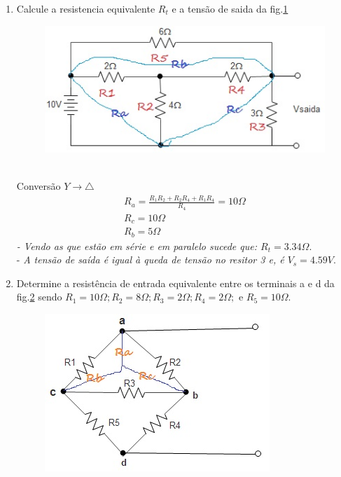 \documentclass[12pt,a4paper,titlepage]{report}
\begin{document}
\begin{enumerate}
\item Calcule a resistencia equivalente $R_t$ e a tensão de saida da fig.\ref{f1}
\begin{figure}[h]
\centering
\includegraphics[scale=0.6]{fig1}
\caption{}
\label {f1}
\end{figure}\\
Convers\~ao $Y \longrightarrow\bigtriangleup$\\
\begin{eqnarray}
R_a=\frac{R_1R_2+R_2R_4+R_1R_4}{R_4}=10\Omega\\
R_c=10\Omega\\
R_b=5\Omega
\end{eqnarray}
\textit{- Vendo as que est\~ao em s\'erie e em paralelo sucede que: $R_t=3.34\Omega$}.\\
- \textit{A tens\~ao de sa\'ida \'e igual \`a queda de tens\~ao no resitor 3 e, \'e  $V_s=4.59V$}.
\vspace{4cm}
\item Determine a resistência de entrada equivalente entre os terminais a e d da fig.\ref{f2} sendo $R_1=10\Omega; R_2=8\Omega;R_3=2\Omega;R_4=2\Omega; $ e $R_5=10\Omega$.
\begin{figure}[htb]
\centering
\includegraphics[scale=0.6]{fig2}
\caption{}
\label {f2}
\end{figure}


\end{enumerate}
\end{document}
